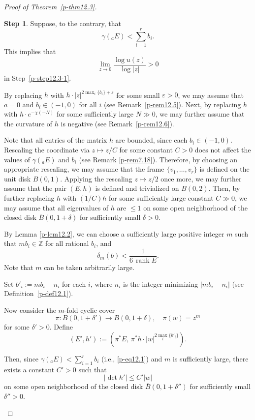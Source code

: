 \documentclass[12pt,twoside]{amsart}
\theoremstyle{definition}
\newtheorem{step}{Step}
\begin{document}
\begin{proof}[Proof of Theorem~\ref{p-thm12.3}]
\begin{step}
Suppose, to the contrary, that
\[
\gamma({}_a E) < \sum_{i=1}^r b_i.
\]
This implies that
\begin{equation}\label{p-eq12.1}
\lim_{z \to 0} \frac{\log u(z)}{\log |z|} > 0
\end{equation}
in Step~\ref{p-step12.3-1}.

By replacing $h$ with $h \cdot |z|^{2 \max_i \{b_i\} 
+ \varepsilon}$ for some small $\varepsilon > 0$, 
we may assume that $a = 0$ and $b_i \in (-1, 0)$ 
for all $i$ (see Remark~\ref{p-rem12.5}).  
Next, by replacing $h$ with $h \cdot e^{-\chi(-N)}$ for some 
sufficiently large $N \gg 0$, we may further assume that the curvature of $h$ is 
negative (see Remark~\ref{p-rem12.6}).

Note that all entries of the matrix $h$ are bounded, since each $b_i \in (-1, 0)$. 
Rescaling the coordinate via 
\( z \mapsto z/C \) for some 
constant \( C > 0 \) does not affect the 
values of \( \gamma({}_a E) \) and \( b_i \) (see Remark \ref{p-rem7.18}). 
Therefore, by choosing an appropriate rescaling, 
we may assume that the frame \( \{v_1, \ldots, v_r\} \) 
is defined on the unit disk \( B(0, 1) \). 
Applying the rescaling \( z \mapsto z/2 \) once more, 
we may further assume that the pair \( (E, h) \) is 
defined and trivialized on \( B(0, 2) \). 
Then, by further replacing $h$ with $(1/C)h$ for some 
sufficiently large constant $C \gg 0$, we may assume 
that all eigenvalues of $h$ are $\leq 1$ on some open 
neighborhood of the closed disk 
$\overline{B}(0, 1 + \delta)$ for sufficiently small $\delta > 0$.

By Lemma \ref{p-lem12.2}, we can choose a 
sufficiently large positive integer $m$ such that 
$m b_i \in \mathbb{Z}$ for all 
rational $b_i$, and
\[
  \delta_m(b) < \frac{1}{6 \, \operatorname{rank} E}.
  \]
Note that $m$ can be taken arbitrarily large.

Set $b'_i := m b_i - n_i$ for each $i$, 
where $n_i$ is the integer minimizing $|m b_i - n_i|$ (see Definition~\ref{p-def12.1}).

Now consider the $m$-fold cyclic cover
\[
\pi \colon B(0, 1 + \delta') \to B(0, 1 + \delta), \quad \pi(w) = z^m
\]
for some $\delta' > 0$.  
Define
\[
(E', h') := \left( \pi^* E, \, \pi^* h \cdot |w|^{2 \max_i \{b'_i\}} \right).
\]

Then, since $\gamma({}_a E) < \sum_{i=1}^r b_i$ (i.e., \eqref{p-eq12.1}) 
and $m$ is sufficiently large, there exists a constant $C' > 0$ such that
\[
|\det h'| \leq C' |w|
\]
on some open neighborhood of the closed disk 
$\overline{B}(0, 1 + \delta'')$ for sufficiently small $\delta'' > 0$.


\end{step}
\end{proof}
\end{document}
